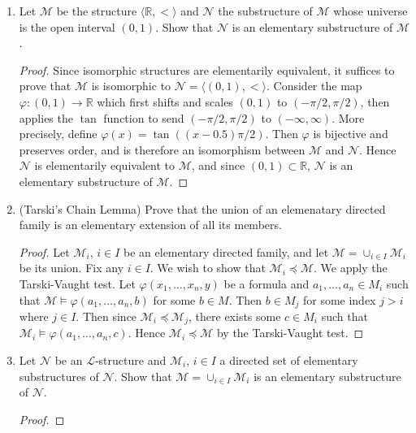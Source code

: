 \documentclass{article}
\begin{document}
\begin{enumerate}
\begin{enumerate}
\begin{proof}
          For each $n\in\mathbb{N}\setminus\{0,1\}$, $S_n$ is unique,
          hence we have infinitely many minimal definable and infinite
          subsets $S_n$.
        \end{proof}
    \end{enumerate}

  \item Let $\mathcal{M}$ be the structure
    $\langle\mathbb{R},<\rangle$ and $\mathcal{N}$ the substructure of
    $\mathcal{M}$ whose universe is the open interval $(0,1)$. Show
    that $\mathcal{N}$ is an elementary substructure of $\mathcal{M}$.

    \begin{proof}
      Since isomorphic structures are elementarily equivalent, it
      suffices to prove that $\mathcal{M}$ is isomorphic to
      $\mathcal{N}=\langle(0,1),<\rangle$. Consider the map
      $\varphi:(0,1)\rightarrow\mathbb{R}$ which first
      shifts and scales $(0,1)$ to $(-\pi/2,\pi/2)$, then applies the
      $\tan$ function to send $(-\pi/2,\pi/2)$ to $(-\infty,\infty)$.
      More precisely, define $\varphi(x)=\tan((x-0.5)\pi/2)$. Then
      $\varphi$ is bijective and preserves order, and is therefore an
      isomorphism between $\mathcal{M}$ and $\mathcal{N}$. Hence
      $\mathcal{N}$ is elementarily equivalent to $\mathcal{M}$, and
      since $(0,1)\subset\mathbb{R}$, $\mathcal{N}$ is an elementary
      substructure of $\mathcal{M}$.
    \end{proof}

  \item (Tarski's Chain Lemma) Prove that the union of an elemenatary
    directed family is an elementary extension of all its members.
    \begin{proof}
      Let $\mathcal{M}_i$, $i\in I$ be an elementary directed family, and
      let $\mathcal{M}=\cup_{i\in I}\mathcal{M}_i$ be its union. Fix any
      $i\in I$. We wish to show that $\mathcal{M}_i\preceq\mathcal{M}$. We
      apply the Tarski-Vaught test. Let $\varphi(x_1,\ldots,x_n,y)$ be a
      formula and $a_1,\ldots,a_n\in M_i$ such that
      $\mathcal{M}\vDash\varphi(a_1,\ldots,a_n,b)$ for some $b\in M$. Then
      $b\in M_j$ for some index $j>i$ where $j\in I$. Then since
      $\mathcal{M}_i\preceq\mathcal{M}_j$, there exists some $c\in M_i$
      such that $\mathcal{M}_i\vDash\varphi(a_1,\ldots,a_n,c)$. Hence
      $\mathcal{M}_i\preceq\mathcal{M}$ by the Tarski-Vaught test.
    \end{proof}

  \item Let $\mathcal{N}$ be an $\mathcal{L}$-structure and
    $\mathcal{M}_i$, $i\in I$ a directed set of elementary substructures of
    $\mathcal{N}$. Show that $\mathcal{M}=\cup_{i\in I}\mathcal{M}_i$ is an
    elementary substructure of $\mathcal{N}$.

    \begin{proof}

    \end{proof}
\end{enumerate}
\end{document}
